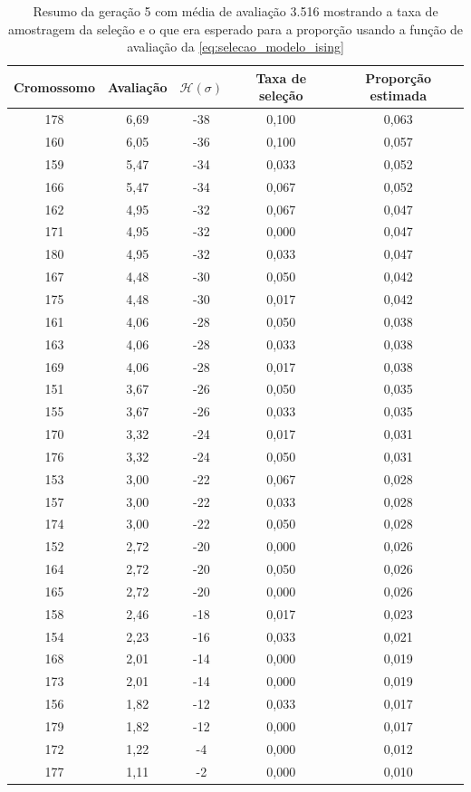 \begin{table}[htb]
	\begin{tabular}{|c|c|c|c|c|}
		\hline
		\textbf{Cromossomo} 	& \textbf{Avaliação} 	& \textbf{\(\mathcal{H}(\sigma) \)}	& \textbf{Taxa de seleção}	& \textbf{Proporção estimada} \\
		\hline
		178	&  6,69		&  -38 &  0,100	&  0,063\\ \hline
		160	&  6,05		&  -36 &  0,100	&  0,057\\ \hline
		159	&  5,47		&  -34 &  0,033	&  0,052\\ \hline
		166	&  5,47		&  -34 &  0,067	&  0,052\\ \hline
		162	&  4,95		&  -32 &  0,067	&  0,047\\ \hline
		171	&  4,95		&  -32 &  0,000	&  0,047\\ \hline
		180	&  4,95		&  -32 &  0,033	&  0,047\\ \hline
		167	&  4,48		&  -30 &  0,050	&  0,042\\ \hline
		175	&  4,48		&  -30 &  0,017	&  0,042\\ \hline
		161	&  4,06		&  -28 &  0,050	&  0,038\\ \hline
		163	&  4,06		&  -28 &  0,033	&  0,038\\ \hline
		169	&  4,06		&  -28 &  0,017	&  0,038\\ \hline
		151	&  3,67		&  -26 &  0,050	&  0,035\\ \hline
		155	&  3,67		&  -26 &  0,033	&  0,035\\ \hline
		170	&  3,32		&  -24 &  0,017	&  0,031\\ \hline
		176	&  3,32		&  -24 &  0,050	&  0,031\\ \hline
		153	&  3,00		&  -22 &  0,067	&  0,028\\ \hline
		157	&  3,00		&  -22 &  0,033	&  0,028\\ \hline
		174	&  3,00		&  -22 &  0,050	&  0,028\\ \hline
		152	&  2,72		&  -20 &  0,000	&  0,026\\ \hline
		164	&  2,72		&  -20 &  0,050	&  0,026\\ \hline
		165	&  2,72		&  -20 &  0,000	&  0,026\\ \hline
		158	&  2,46		&  -18 &  0,017	&  0,023\\ \hline
		154	&  2,23		&  -16 &  0,033	&  0,021\\ \hline
		168	&  2,01		&  -14 &  0,000	&  0,019\\ \hline
		173	&  2,01		&  -14 &  0,000	&  0,019\\ \hline
		156	&  1,82		&  -12 &  0,033	&  0,017\\ \hline
		179	&  1,82		&  -12 &  0,000	&  0,017\\ \hline
		172	&  1,22		&  -4 &  0,000	&  0,012\\ \hline
		177	&  1,11		&  -2 &  0,000	&  0,010\\
		\hline
	\end{tabular}
	\caption{Resumo da geração 5 com média de avaliação 3.516 mostrando a taxa de amostragem da seleção e o que era esperado para a proporção usando a função de avaliação da \autoref{eq:selecao_modelo_ising}}
	\label{tab:resumo_GA_expH}
\end{table}

